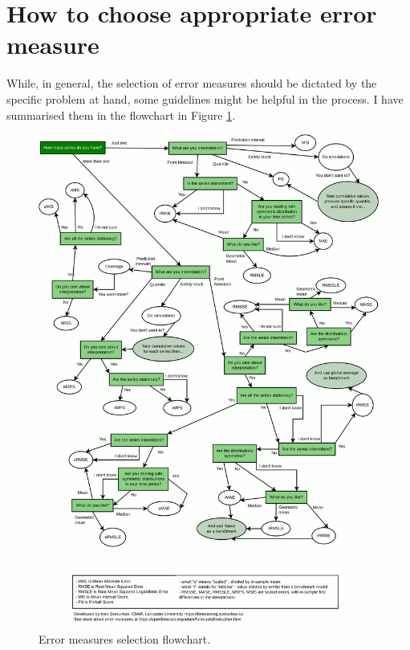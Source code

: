 \documentclass[]{book}
\theoremstyle{definition}
\theoremstyle{definition}
\theoremstyle{definition}
\theoremstyle{definition}
\theoremstyle{remark}
\begin{document}
\hypertarget{errorMeasuresSelection}{%
\section{How to choose appropriate error measure}\label{errorMeasuresSelection}}

While, in general, the selection of error measures should be dictated by the specific problem at hand, some guidelines might be helpful in the process. I have summarised them in the flowchart in Figure \ref{fig:errorMeasuresFlowChart}.

\begin{figure}
\includegraphics[width=1\linewidth]{./images/errorMeasuresFlowChart} \caption{Error measures selection flowchart.}\label{fig:errorMeasuresFlowChart}
\end{figure}
\end{document}
